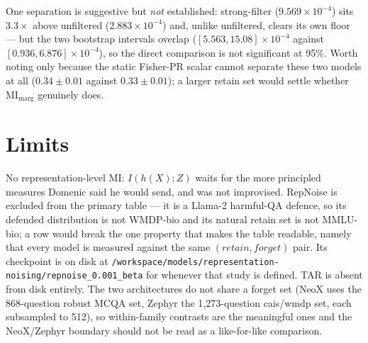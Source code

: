 \documentclass[11pt]{article}
\begin{document}
One separation is suggestive but \emph{not} established: strong-filter
($9.569\times10^{-4}$) sits $3.3\times$ above unfiltered ($2.883\times10^{-4}$) and, unlike
unfiltered, clears its own floor --- but the two bootstrap intervals overlap
($[5.563,15.08]\times10^{-4}$ against $[0.936,6.876]\times10^{-4}$), so the direct comparison
is not significant at 95\%. Worth noting only because the static Fisher-PR scalar cannot
separate these two models at all ($0.34\pm0.01$ against $0.33\pm0.01$); a larger retain set
would settle whether $\mathrm{MI}_{\mathrm{marg}}$ genuinely does.
\section{Limits}
No representation-level MI: $I(h(X);Z)$ waits for the more principled measures
Domenic said he would send, and was not improvised. RepNoise is excluded from the primary
table --- it is a Llama-2 harmful-QA defence, so its defended distribution is not WMDP-bio
and its natural retain set is not MMLU-bio; a row would break the one property that makes
the table readable, namely that every model is measured against the same $(retain, forget)$
pair. Its checkpoint is on disk at \texttt{/workspace/models/representation-noising/repnoise\_0.001\_beta} for whenever that study is defined. TAR is absent from disk entirely. The two
architectures do not share a forget set (NeoX uses the 868-question robust MCQA set, Zephyr
the 1{,}273-question cais/wmdp set, each subsampled to 512), so within-family contrasts are
the meaningful ones and the NeoX/Zephyr boundary should not be read as a like-for-like
comparison.
\end{document}
